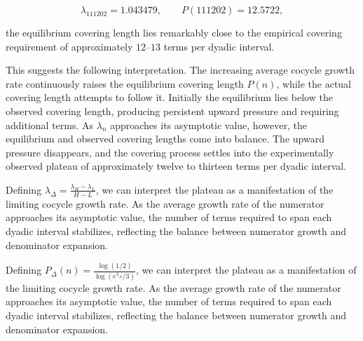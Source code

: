 \documentclass[12pt, oneside]{article}
\numberwithin{equation}{section}
\theoremstyle{definition}
\theoremstyle{plain}
\theoremstyle{remark}
\begin{document}
\[
\lambda_{111202}=1.043479,
\qquad
P(111202)=12.5722,
\]

the equilibrium covering length lies remarkably close to the empirical covering requirement of approximately $12$--$13$ terms per dyadic interval.

This suggests the following interpretation. The increasing average cocycle growth rate continuously raises the equilibrium covering length $P(n)$, while the actual covering length attempts to follow it. Initially the equilibrium lies below the observed covering length, producing persistent upward pressure and requiring additional terms. As $\lambda_n$ approaches its asymptotic value, however, the equilibrium and observed covering lengths come into balance. The upward pressure disappears, and the covering process settles into the experimentally observed plateau of approximately twelve to thirteen terms per dyadic interval.


Defining $\lambda_{\Delta} = \frac{\lambda_{H} - \lambda_{L}}{H-L}$, we can interpret the plateau as a manifestation of the limiting cocycle growth rate. As the average growth rate of the numerator approaches its asymptotic value, the number of terms required to span each dyadic interval stabilizes, reflecting the balance between numerator growth and denominator expansion.

Defining $P_{\Delta}(n) = \frac{\log(1/2)}{\log(e^{\lambda_{\Delta}}/3)}$, we can interpret the plateau as a manifestation of the limiting cocycle growth rate. As the average growth rate of the numerator approaches its asymptotic value, the number of terms required to span each dyadic interval stabilizes, reflecting the balance between numerator growth and denominator expansion.
\end{document}
